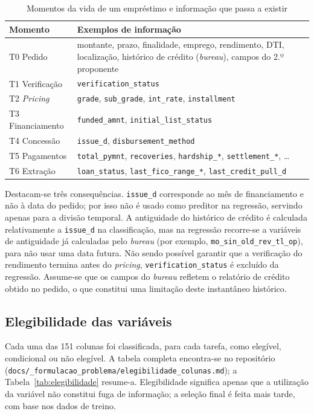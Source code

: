 \begin{table}[!t]
\caption{Momentos da vida de um empréstimo e informação que passa a existir}
\label{tab:momentos}
\centering
\footnotesize
\begin{tabular}{|p{}|p{}|}
\hline
\textbf{Momento} & \textbf{Exemplos de informação} \\
\hline
T0 Pedido & montante, prazo, finalidade, emprego, rendimento, DTI, localização, histórico de crédito (\textit{bureau}), campos do 2.º proponente \\
\hline
T1 Verificação & \texttt{verification\_status} \\
\hline
T2 \textit{Pricing} & \texttt{grade}, \texttt{sub\_grade}, \texttt{int\_rate}, \texttt{installment} \\
\hline
T3 Financiamento & \texttt{funded\_amnt}, \texttt{initial\_list\_status} \\
\hline
T4 Concessão & \texttt{issue\_d}, \texttt{disbursement\_method} \\
\hline
T5 Pagamentos & \texttt{total\_pymnt}, \texttt{recoveries}, \texttt{hardship\_*}, \texttt{settlement\_*}, \ldots \\
\hline
T6 Extração & \texttt{loan\_status}, \texttt{last\_fico\_range\_*}, \texttt{last\_credit\_pull\_d} \\
\hline
\end{tabular}
\end{table}

Destacam-se três consequências. \texttt{issue\_d} corresponde ao mês de financiamento e não à data do pedido; por isso não é usado como preditor na regressão, servindo apenas para a divisão temporal. A antiguidade do histórico de crédito é calculada relativamente a \texttt{issue\_d} na classificação, mas na regressão recorre-se a variáveis de antiguidade já calculadas pelo \textit{bureau} (por exemplo, \texttt{mo\_sin\_old\_rev\_tl\_op}), para não usar uma data futura. Não sendo possível garantir que a verificação do rendimento termina antes do \textit{pricing}, \texttt{verification\_status} é excluído da regressão. Assume-se que os campos do \textit{bureau} refletem o relatório de crédito obtido no pedido, o que constitui uma limitação deste instantâneo histórico.


\subsection{Elegibilidade das variáveis}

Cada uma das 151 colunas foi classificada, para cada tarefa, como elegível, condicional ou não elegível. A tabela completa encontra-se no repositório (\texttt{docs/\_formulacao\_problema/\allowbreak elegibilidade\_colunas.md}); a Tabela~\ref{tab:elegibilidade} resume-a. Elegibilidade significa apenas que a utilização da variável não constitui fuga de informação; a seleção final é feita mais tarde, com base nos dados de treino.

